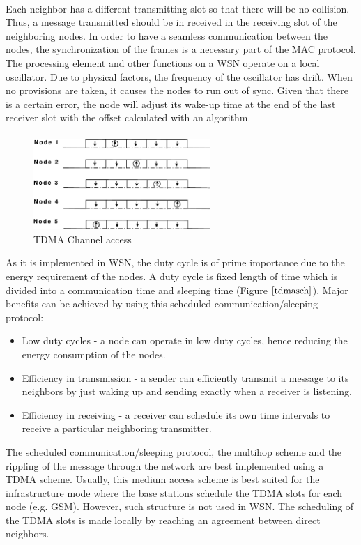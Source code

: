 \documentclass[a4paper,10pt]{report}
\begin{document}
\paragraph*{}
Each neighbor has a different transmitting slot so that there will be no collision. Thus, a message transmitted should be in received in the receiving slot of the neighboring nodes. In order to have a seamless communication between the nodes, the synchronization of the frames is a necessary part of the MAC protocol. The processing element and other functions on a WSN operate on a local oscillator. Due to physical factors, the frequency of the oscillator has drift. When no provisions are taken, it causes the nodes to run out of sync. Given that there is a certain error, the node will adjust its wake-up time at the end of the last receiver slot with the offset calculated with an algorithm. \paragraph*{}
\begin{figure}
\centering
\includegraphics[width=0.6\textwidth]{tdmaschedule}
\caption{TDMA Channel access} \label{tdmasch}
\end{figure}
As it is implemented in WSN, the duty cycle is of prime importance due to the energy requirement of the nodes. A duty cycle is fixed length of time which is divided into a communication time and sleeping time (Figure $\ref{tdmasch}$). Major benefits can be achieved
by using this scheduled communication/sleeping protocol:
\begin{itemize}
\item Low duty cycles - a node can operate in low duty cycles, hence reducing the energy consumption of the nodes.
\item Efficiency in transmission - a sender can efficiently transmit a message to its neighbors by just waking up and sending exactly when a receiver is listening.
\item Efficiency in receiving - a receiver can schedule its own time intervals to receive a particular neighboring transmitter.
\end{itemize}
The scheduled communication/sleeping protocol, the multihop scheme and the rippling of the message through the network are best implemented using a TDMA scheme. Usually, this medium access scheme is best suited for the infrastructure mode where the base stations schedule the TDMA slots for each node (e.g. GSM). However, such structure is not used in WSN. The scheduling of the TDMA slots is made locally by reaching an agreement between direct neighbors.
\end{document}
